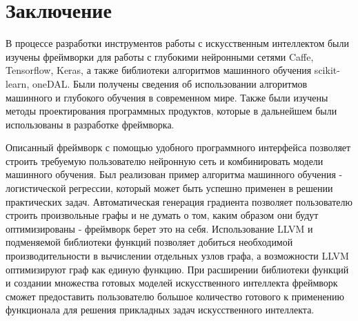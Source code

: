 \clearpage
\section{Заключение}
В процессе разработки инструментов работы с искусственным интеллектом были изучены фреймворки для работы с глубокими нейронными сетями Caffe, Tensorflow, Keras, а также библиотеки алгоритмов машинного обучения scikit-learn, oneDAL. Были получены сведения об использовании алгоритмов машинного и глубокого обучения в современном мире. Также были изучены методы проектирования программных продуктов, которые в дальнейшем были использованы в разработке фреймворка.

Описанный фреймворк с помощью удобного программного интерфейса позволяет строить требуемую пользователю нейронную сеть и комбинировать модели машинного обучения. Был реализован пример алгоритма машинного обучения - логистической регрессии, который может быть успешно применен в решении практических задач. Автоматическая генерация градиента позволяет пользователю строить произвольные графы и не думать о том, каким образом они будут оптимизированы - фреймворк берет это на себя. Использование LLVM и подменяемой библиотеки функций позволяет добиться необходимой производительности в вычислении отдельных узлов графа, а возможности LLVM оптимизируют граф как единую функцию. При расширении библиотеки функций и создании множества готовых моделей искусственного интеллекта фреймворк сможет предоставить пользователю большое количество готового к применению функционала для решения прикладных задач искусственного интеллекта.
